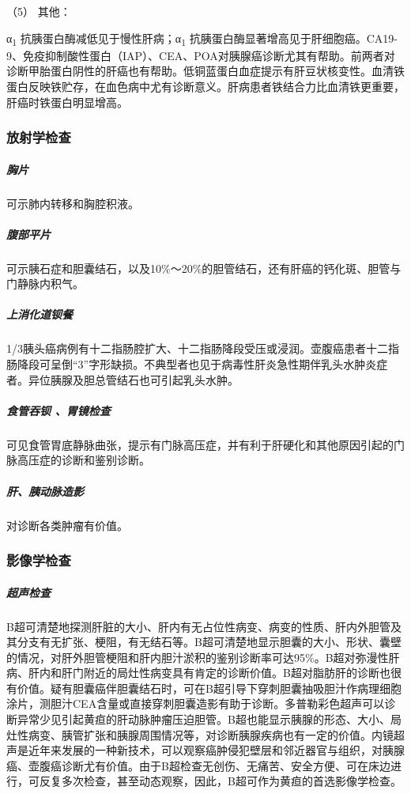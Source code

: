 \hypertarget{text00039.htmlux5cux23CHP1-16-3-4-4-5}{}
（5） 其他：

α\textsubscript{1} 抗胰蛋白酶减低见于慢性肝病；α\textsubscript{1}
抗胰蛋白酶显著增高见于肝细胞癌。CA19-9、免疫抑制酸性蛋白（IAP）、CEA、POA对胰腺癌诊断尤其有帮助。前两者对诊断甲胎蛋白阴性的肝癌也有帮助。低铜蓝蛋白血症提示有肝豆状核变性。血清铁蛋白反映铁贮存，在血色病中尤有诊断意义。肝病患者铁结合力比血清铁更重要，肝癌时铁蛋白明显增高。

\subsubsection{放射学检查}

\subparagraph{胸片}

可示肺内转移和胸腔积液。

\subparagraph{腹部平片}

可示胰石症和胆囊结石，以及10\%～20\%的胆管结石，还有肝癌的钙化斑、胆管与门静脉内积气。

\subparagraph{上消化道钡餐}

1/3胰头癌病例有十二指肠腔扩大、十二指肠降段受压或浸润。壶腹癌患者十二指肠降段可呈倒“3”字形缺损。不典型者也见于病毒性肝炎急性期伴乳头水肿炎症者。异位胰腺及胆总管结石也可引起乳头水肿。

\subparagraph{食管吞钡 、胃镜检查}

可见食管胃底静脉曲张，提示有门脉高压症，并有利于肝硬化和其他原因引起的门脉高压症的诊断和鉴别诊断。

\subparagraph{肝、胰动脉造影}

对诊断各类肿瘤有价值。

\subsubsection{影像学检查}

\subparagraph{超声检查}

B超可清楚地探测肝脏的大小、肝内有无占位性病变、病变的性质、肝内外胆管及其分支有无扩张、梗阻，有无结石等。B超可清楚地显示胆囊的大小、形状、囊壁的情况，对肝外胆管梗阻和肝内胆汁淤积的鉴别诊断率可达95\%。B超对弥漫性肝病、肝内和肝门附近的局灶性病变具有肯定的诊断价值。B超对脂肪肝的诊断也很有价值。疑有胆囊癌伴胆囊结石时，可在B超引导下穿刺胆囊抽吸胆汁作病理细胞涂片，测胆汁CEA含量或直接穿刺胆囊造影有助于诊断。多普勒彩色超声可以诊断异常少见引起黄疸的肝动脉肿瘤压迫胆管。B超也能显示胰腺的形态、大小、局灶性病变、胰管扩张和胰腺周围情况等，对诊断胰腺疾病也有一定的价值。内镜超声是近年来发展的一种新技术，可以观察癌肿侵犯壁层和邻近器官与组织，对胰腺癌、壶腹癌诊断尤有价值。由于B超检查无创伤、无痛苦、安全方便、可在床边进行，可反复多次检查，甚至动态观察，因此，B超可作为黄疸的首选影像学检查。

